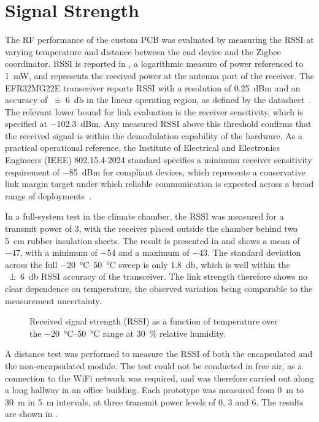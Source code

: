 \section{Signal Strength} \label{sec:signal_strength}
The RF performance of the custom PCB was evaluated by measuring the RSSI at varying temperature and distance between the end device and the Zigbee coordinator. RSSI is reported in \si{\dBm}, a logarithmic measure of power referenced to \SI{1}{\milli\watt}, and represents the received power at the antenna port of the receiver.
The EFR32MG22E transceiver reports RSSI with a resolution of \SI{0.25}{dBm} and an accuracy of \SI{\pm 6}{\decibel} in the linear operating region, as defined by the datasheet~\cite{EFR32MG22E}.
The relevant lower bound for link evaluation is the receiver sensitivity, which is specified at \SI{-102.3}{dBm}. Any measured RSSI above this threshold confirms that the received signal is within the demodulation capability of the hardware.
As a practical operational reference, the Institute of Electrical and Electronics Engineers (IEEE) 802.15.4-2024 standard specifies a minimum receiver sensitivity requirement of \SI{-85}{dBm} for compliant devices, which represents a conservative link margin target under which reliable communication is expected across a broad range of deployments~\cite{IEEE8021542024}.

In a full-system test in the climate chamber, the RSSI was measured for a transmit power of \SI{3}{\dBm}, with the receiver placed outside the chamber behind two \SI{5}{\centi\meter} rubber insulation sheets. The result is presented in  and shows a mean of \SI{-47}{\dBm}, with a minimum of \SI{-54}{\dBm} and a maximum of \SI{-43}{\dBm}. The standard deviation across the full \SIrange{-20}{50}{\celsius} sweep is only \SI{1.8}{\decibel}, which is well within the \SI{\pm6}{\decibel} RSSI accuracy of the transceiver. The link strength therefore shows no clear dependence on temperature, the observed variation being comparable to the measurement uncertainty.

\begin{figure}
\centering

    \caption{Received signal strength (RSSI) as a function of temperature over the \SIrange{-20}{50}{\celsius} range at \SI{30}{\percent} relative humidity.}
    \label{fig:FS_RSSI}
\end{figure}

A distance test was performed to measure the RSSI of both the encapsulated and the non-encapsulated module. The test could not be conducted in free air, as a connection to the WiFi network was required, and was therefore carried out along a long hallway in an office building. Each prototype was measured from \SI{0}{\meter} to \SI{30}{\meter} in \SI{5}{\meter} intervals, at three transmit power levels of \SI{0}{\dBm}, \SI{3}{\dBm} and \SI{6}{\dBm}. The results are shown in .

